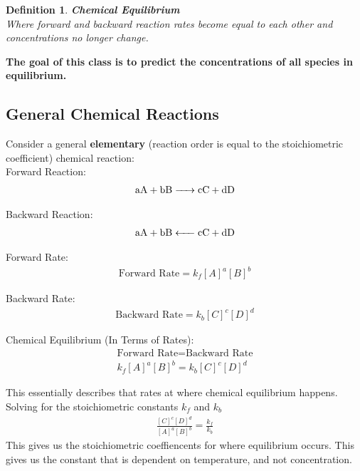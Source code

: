 \documentclass{article}  %
\newtheorem{defn}{Definition}
\begin{document}
\begin{defn}
    \textbf{Chemical Equilibrium} \\
    Where forward and backward reaction rates become equal to each other and concentrations no longer change.
\end{defn}

\textbf{The goal of this class is to predict the concentrations of all species in equilibrium.}

\subsection*{General Chemical Reactions}
Consider a general \textbf{elementary} (reaction order is equal to the stoichiometric coefficient) chemical reaction: \\
Forward Reaction:
\begin{equation*}
    \begin{aligned}
        \ce{aA + bB -> cC + dD}
    \end{aligned}
\end{equation*}

Backward Reaction:
\begin{equation*}
    \begin{aligned}
        \ce{aA + bB <- cC + dD}
    \end{aligned}
\end{equation*}

Forward Rate:
\begin{equation*}
    \begin{aligned}
        \text{Forward Rate} = k_f[A]^a[B]^b
    \end{aligned}
\end{equation*}

Backward Rate:
\begin{equation*}
    \begin{aligned}
        \text{Backward Rate} = k_b[C]^c[D]^d
    \end{aligned}
\end{equation*}

Chemical Equilibrium (In Terms of Rates):
\begin{equation*}
    \begin{aligned}
        \text{Forward Rate} = \text{Backward Rate} \\
        k_f[A]^a[B]^b = k_b[C]^c[D]^d
    \end{aligned}
\end{equation*}

This essentially describes that rates at where chemical equilibrium happens.
Solving for the stoichiometric constants $k_f$ and $k_b$
\begin{equation*}
    \begin{aligned}
        \frac{[C]^c[D]^d}{[A]^a[B]^b} = \frac{k_f}{k_b}     
    \end{aligned}
\end{equation*}
This gives us the stoichiometric coeffiencents for where equilibrium occurs. This gives us the constant that is dependent on temperature, and not concentration.
\end{document}
